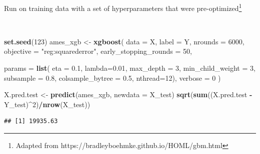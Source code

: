 \documentclass[
  10pt,
  ignorenonframetext,
]{beamer}
\newenvironment{Shaded}{\begin{snugshade}}{\end{snugshade}}
\newcommand{\AttributeTok}[1]{\textcolor[rgb]{0.13,0.29,0.53}{#1}}
\newcommand{\DecValTok}[1]{\textcolor[rgb]{0.00,0.00,0.81}{#1}}
\newcommand{\FloatTok}[1]{\textcolor[rgb]{0.00,0.00,0.81}{#1}}
\newcommand{\FunctionTok}[1]{\textcolor[rgb]{0.13,0.29,0.53}{\textbf{#1}}}
\newcommand{\NormalTok}[1]{#1}
\newcommand{\OtherTok}[1]{\textcolor[rgb]{0.56,0.35,0.01}{#1}}
\newcommand{\SpecialCharTok}[1]{\textcolor[rgb]{0.81,0.36,0.00}{\textbf{#1}}}
\newcommand{\StringTok}[1]{\textcolor[rgb]{0.31,0.60,0.02}{#1}}
\begin{document}
\begin{frame}[fragile]
Run on training data with a set of hyperparameters that were
pre-optimized\footnote{Adapted from https://bradleyboehmke.github.io/HOML/gbm.html}

\(~\)

\scriptsize

\begin{Shaded}
\begin{Highlighting}[]
\FunctionTok{set.seed}\NormalTok{(}\DecValTok{123}\NormalTok{)}
\NormalTok{ames\_xgb }\OtherTok{\textless{}{-}} \FunctionTok{xgboost}\NormalTok{(}
  \AttributeTok{data =}\NormalTok{ X,}
  \AttributeTok{label =}\NormalTok{ Y,}
  \AttributeTok{nrounds =} \DecValTok{6000}\NormalTok{,}
  \AttributeTok{objective =} \StringTok{"reg:squarederror"}\NormalTok{,}
  \AttributeTok{early\_stopping\_rounds =} \DecValTok{50}\NormalTok{,   }
  
  \AttributeTok{params =} \FunctionTok{list}\NormalTok{( }
    \AttributeTok{eta =} \FloatTok{0.1}\NormalTok{,}
    \AttributeTok{lambda=}\FloatTok{0.01}\NormalTok{,}
    \AttributeTok{max\_depth =} \DecValTok{3}\NormalTok{,}
    \AttributeTok{min\_child\_weight =} \DecValTok{3}\NormalTok{,}
    \AttributeTok{subsample =} \FloatTok{0.8}\NormalTok{,}
    \AttributeTok{colsample\_bytree =} \FloatTok{0.5}\NormalTok{,}
    \AttributeTok{nthread=}\DecValTok{12}\NormalTok{),}
  \AttributeTok{verbose =} \DecValTok{0}
\NormalTok{)  }
\end{Highlighting}
\end{Shaded}

\begin{Shaded}
\begin{Highlighting}[]
\NormalTok{X.pred.test }\OtherTok{\textless{}{-}} \FunctionTok{predict}\NormalTok{(ames\_xgb, }\AttributeTok{newdata =}\NormalTok{ X\_test)}
\FunctionTok{sqrt}\NormalTok{(}\FunctionTok{sum}\NormalTok{((X.pred.test }\SpecialCharTok{{-}}\NormalTok{ Y\_test)}\SpecialCharTok{\^{}}\DecValTok{2}\NormalTok{)}\SpecialCharTok{/}\FunctionTok{nrow}\NormalTok{(X\_test))}
\end{Highlighting}
\end{Shaded}

\begin{verbatim}
## [1] 19935.63
\end{verbatim}
\end{frame}
\end{document}

